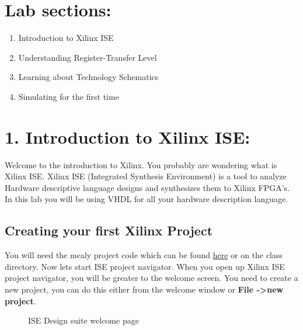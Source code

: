 \documentclass{article}
\begin{document}
\section{Lab sections:}
\begin{enumerate}
  \item Introduction to Xilinx ISE
  \item Understanding Register-Transfer Level
  \item Learning about Technology Schematics
  \item Simulating for the first time
\end{enumerate}

\newpage

\section{1. Introduction to Xilinx ISE:}
Welcome to the introduction to Xilinx. You probably are wondering what is Xilinx ISE. Xilinx ISE (Integrated Synthesis Environment) is a tool to analyze Hardware descriptive language designs and synthesizes them to Xilinx FPGA's. In this lab you will be using VHDL for all your hardware description language.

\subsection{Creating your first Xilinx Project}

You will need the mealy project code which can be found \href{https://github.com/reiuiji/ECE368-Lab/tree/master/Lab%201/MealyFSM/}{here} or on the class directory.
Now lets start ISE project navigator. When you open up Xilinx ISE project navigator, you will be greater to the welcome screen. You need to create a new project, you can do this either from the welcome window or \textbf{File -\textgreater new project}.

\begin{figure}[!h]
  \centering
  \caption{ISE\textsuperscript{\textregistered} Design suite welcome page}
\end{figure}
\end{document}
